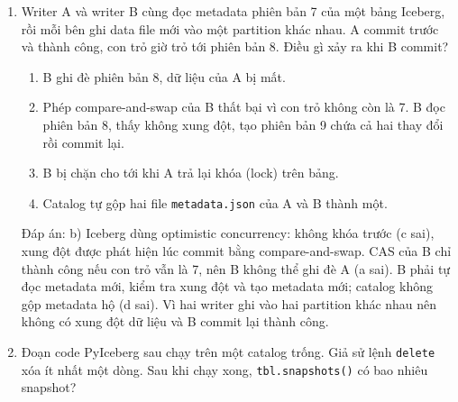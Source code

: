 \documentclass[12pt]{article}
\begin{document}
\begin{enumerate}[label=\textbf{\arabic*.}, leftmargin=1.6em, itemsep=1.2em]
\item Writer A và writer B cùng đọc metadata phiên bản 7 của một bảng Iceberg, rồi mỗi bên ghi data file mới vào một partition khác nhau. A commit trước và thành công, con trỏ giờ trỏ tới phiên bản 8. Điều gì xảy ra khi B commit?

\begin{enumerate}[label=\alph*), leftmargin=2.2em, itemsep=1pt]
    \item B ghi đè phiên bản 8, dữ liệu của A bị mất.
    \item Phép compare-and-swap của B thất bại vì con trỏ không còn là 7. B đọc phiên bản 8, thấy không xung đột, tạo phiên bản 9 chứa cả hai thay đổi rồi commit lại.
    \item B bị chặn cho tới khi A trả lại khóa (lock) trên bảng.
    \item Catalog tự gộp hai file \texttt{metadata.json} của A và B thành một.
\end{enumerate}
\begin{guidelinebox}{Đáp án: b)}
Iceberg dùng optimistic concurrency: không khóa trước (c sai), xung đột được phát hiện lúc commit bằng compare-and-swap. CAS của B chỉ thành công nếu con trỏ vẫn là 7, nên B không thể ghi đè A (a sai). B phải tự đọc metadata mới, kiểm tra xung đột và tạo metadata mới; catalog không gộp metadata hộ (d sai). Vì hai writer ghi vào hai partition khác nhau nên không có xung đột dữ liệu và B commit lại thành công.
\end{guidelinebox}

\item Đoạn code PyIceberg sau chạy trên một catalog trống. Giả sử lệnh \texttt{delete} xóa ít nhất một dòng. Sau khi chạy xong, \texttt{tbl.snapshots()} có bao nhiêu snapshot?


\end{enumerate}
\end{document}
